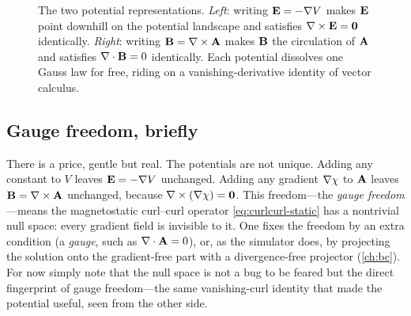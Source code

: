 \begin{figure}[t]
\centering
{}
\caption[The potential representations]{The two potential representations.
\emph{Left}: writing $\mathbf{E}=-\nabla V$ makes $\mathbf{E}$ point downhill on the potential
landscape and satisfies $\nabla\times\mathbf{E}=\bm0$ identically. \emph{Right}: writing
$\mathbf{B}=\nabla\times\mathbf{A}$ makes $\mathbf{B}$ the circulation of $\mathbf{A}$ and satisfies $\nabla\cdot\mathbf{B}=0$
identically. Each potential dissolves one Gauss law for free, riding on a
vanishing-derivative identity of vector calculus.}
\label{fig:potentials}
\end{figure}

\subsection{Gauge freedom, briefly}

There is a price, gentle but real. The potentials are not unique. Adding any
constant to $V$ leaves $\mathbf{E}=-\nabla V$ unchanged. Adding any gradient $\nabla
\chi$ to $\mathbf{A}$ leaves $\mathbf{B}=\nabla\times\mathbf{A}$ unchanged, because $\nabla\times(\nabla\chi)=\bm0$.
This freedom---the \emph{gauge freedom}---means the magnetostatic curl--curl
operator \eqref{eq:curlcurl-static} has a nontrivial null space: every gradient
field is invisible to it. One fixes the freedom by an extra condition (a
\emph{gauge}, such as $\nabla\cdot\mathbf{A}=0$), or, as the simulator does, by projecting
the solution onto the gradient-free part with a divergence-free projector
(\cref{ch:bc}). For now simply note that the null space is not a bug to be
feared but the direct fingerprint of gauge freedom---the same vanishing-curl
identity that made the potential useful, seen from the other side.

